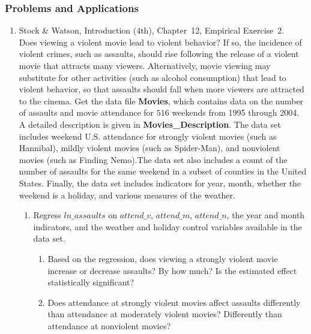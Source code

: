 

\begin{frame}
\frametitle{Problems and Applications}
\begin{enumerate}
\item Stock \& Watson, Introduction (4th), Chapter~12, Empirical Exercise~2.
\\[1ex]
Does viewing a violent movie lead to violent behavior? If so, the incidence of violent crimes, such as assaults, should rise following the release of a violent movie that attracts many viewers. Alternatively, movie viewing may substitute for other activities (such as alcohol consumption) that lead to violent behavior, so that assaults should fall when more viewers are attracted to the cinema. Get the data file \textbf{Movies}, which contains data on the number of assaults and movie attendance for $516$ weekends from 1995 through 2004. A detailed description is given in \textbf{Movies\_Description}. The data set includes weekend U.S. attendance for strongly violent movies (such as Hannibal), mildly violent movies (such as Spider-Man), and nonviolent movies (such as Finding Nemo).The data set also includes a count of the number of assaults for the same weekend in a subset of counties in the United States. Finally, the data set includes indicators for year, month, whether the weekend is a holiday, and various measures of the weather.
\begin{enumerate}
\begin{enumerate}
\item Regress the logarithm of the number of assaults on the year and month indicators. Is there evidence of seasonality in assaults? That is, do there tend to be more assaults in some months than others? Explain.
\item Regress total movie attendance on the year and month indicators. Is there evidence of seasonality in movie attendance? Explain.
\end{enumerate}
\item Regress $ln\_assaults$ on $attend\_v$, $attend\_m$, $attend\_n$, the year and month indicators, and the weather and holiday control variables available in the data set.
\begin{enumerate}
\item Based on the regression, does viewing a strongly violent movie increase or decrease assaults? By how much? Is the estimated effect statistically significant?
\item Does attendance at strongly violent movies affect assaults differently than attendance at moderately violent movies? Differently than attendance at nonviolent movies?

\end{enumerate}
\end{enumerate}
\end{enumerate}
\end{frame}
